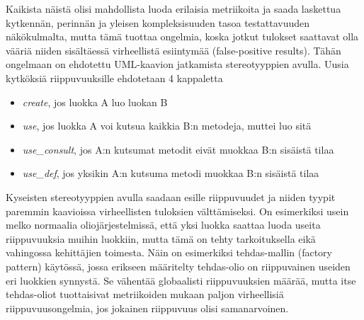 \documentclass[finnish]{tktltiki2}
\numberwithin{table}{section}
\theoremstyle{definition}
\theoremstyle{remark}
\begin{document}
\noindent
Kaikista näistä olisi mahdollista luoda erilaisia metriikoita ja saada laskettua kytkennän, perinnän ja yleisen kompleksisuuden tasoa testattavuuden näkökulmalta, mutta tämä tuottaa ongelmia, koska jotkut tulokset saattavat olla vääriä niiden sisältäessä virheellistä esiintymää (false-positive results). Tähän ongelmaan on ehdotettu UML-kaavion jatkamista stereotyyppien avulla. Uusia kytköksiä riippuvuuksille ehdotetaan 4 kappaletta \citep[s. 4]{baudry_measuring_2003}

\begin{itemize}
	\item \textit{create}, jos luokka A luo luokan B
	\item \textit{use}, jos luokka A voi kutsua kaikkia B:n metodeja, muttei luo sitä
	\item \textit{use\_consult}, jos A:n kutsumat metodit eivät muokkaa B:n sisäistä tilaa
	\item \textit{use\_def}, jos yksikin A:n kutsuma metodi muokkaa B:n sisäistä tilaa
\end{itemize}

\noindent
Kyseisten stereotyyppien avulla saadaan esille riippuvuudet ja niiden tyypit paremmin kaavioissa virheellisten tuloksien välttämiseksi. On esimerkiksi usein melko normaalia oliojärjestelmissä, että yksi luokka saattaa luoda useita riippuvuuksia muihin luokkiin, mutta tämä on tehty tarkoituksella eikä vahingossa kehittäjien toimesta. Näin on esimerkiksi tehdas-mallin (factory pattern) käytössä, jossa erikseen määritelty tehdas-olio on riippuvainen useiden eri luokkien synnystä. Se vähentää globaalisti riippuvuuksien määrää, mutta itse tehdas-oliot tuottaisivat metriikoiden mukaan paljon virheellisiä riippuvuusongelmia, jos jokainen riippuvuus olisi samanarvoinen.





\end{document}
